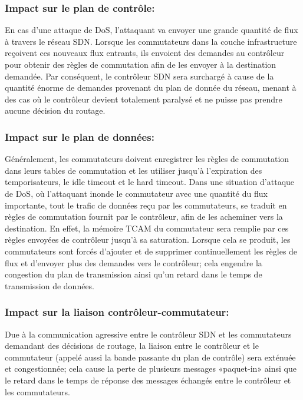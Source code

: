 \subsubsection{Impact sur le plan de contrôle:}
En cas d’une attaque de DoS, l’attaquant va envoyer une grande quantité de flux à travers le réseau SDN. Lorsque les commutateurs dans la couche infrastructure reçoivent ces nouveaux flux entrants, ils envoient des demandes au contrôleur pour obtenir des règles de commutation afin de les envoyer à la destination demandée. Par conséquent, le contrôleur SDN sera surchargé à cause de la quantité énorme de demandes provenant du plan de donnée du réseau, menant à des cas où le contrôleur devient totalement paralysé et ne puisse pas prendre aucune décision du routage.

\subsubsection{Impact sur le plan de données:}
Généralement, les commutateurs doivent enregistrer les règles de commutation dans leurs tables de commutation et les utiliser jusqu’à l’expiration des temporisateurs, le idle timeout et le hard timeout. Dans une situation d’attaque de DoS, où l’attaquant inonde le commutateur avec une quantité du flux importante, tout le trafic de données reçu par les commutateurs, se traduit en règles de commutation fournit par le contrôleur, afin de les acheminer vers la destination. En effet, la mémoire TCAM du commutateur sera remplie par ces règles envoyées de contrôleur jusqu’à sa saturation. Lorsque cela se produit, les commutateurs sont forcés d’ajouter et de supprimer continuellement les règles de flux et d’envoyer plus des demandes vers le contrôleur; cela engendre la congestion du plan de transmission ainsi qu’un retard dans le temps de transmission de données.

\subsubsection{Impact sur la liaison contrôleur-commutateur:}
Due à la communication agressive entre le contrôleur SDN et les commutateurs demandant des décisions de routage, la liaison entre le contrôleur et le commutateur (appelé aussi la bande passante du plan de contrôle) sera exténuée et congestionnée; cela cause la perte de plusieurs messages «paquet-in» ainsi que le retard dans le temps de réponse des messages échangés entre le contrôleur et les commutateurs.

